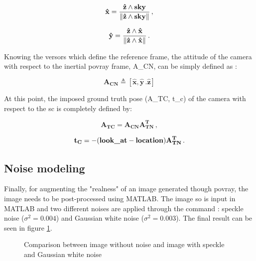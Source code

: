 \begin{equation}
  \mathbf{\hat{x}} = \frac{\mathbf{\hat{z}} \wedge \text{\inlinecode{POV}{sky}}}{\norm{\mathbf{\hat{z}} \wedge \text{\inlinecode{POV}{sky}}}} \,,
\end{equation}

\begin{equation}
  \mathbf{\hat{y}} = \frac{\mathbf{\hat{z}} \wedge \mathbf{\hat{x}}}{\left\lVert\mathbf{\hat{z}} \wedge \mathbf{\hat{x}}\right\rVert} \,.
\end{equation}

Knowing the versors which define the reference frame, the attitude of the camera with respect to the inertial \acrshort{povray} frame, \gls{A_CN}, can be simply defined as :

\begin{equation}
  \mathbf{{A_{CN}}} \triangleq [\mathbf{\hat{x}}, \mathbf{\hat{y}} \,. \mathbf{\hat{z}}]
\end{equation}

At this point, the imposed ground truth pose (\gls{A_TC}, \gls{t_c}) of the camera with respect to the \acrshort{sc} is completely defined by:

\begin{equation}
  \mathbf{{A_{TC}}} = \mathbf{{A_{CN}}} \mathbf{{A^T_{TN}}} \,,
\end{equation}

\begin{equation}
  \mathbf{t_C} = - (\text{\inlinecode{POV}{look_at}} - \text{\inlinecode{POV}{location}}) \mathbf{{A^T_{TN}}} \,.
\end{equation}

\subsection{Noise modeling}\label{subsection:addingthenoise}
Finally, for augmenting the "realness" of an image generated though \acrshort{povray}, the image needs to be post-processed using MATLAB.
The image so is input in MATLAB and two different noises are applied through the  command : speckle noise ($\sigma^2 = 0.004$) and Gaussian white noise ($\sigma^2 = 0.003$).
The final result can be seen in figure \ref{fig:comparisonNoise}.

\begin{figure}[htbp]
  \centering
  \qquad
  \caption{Comparison between image without noise and image with speckle and Gaussian white noise}
  \label{fig:comparisonNoise}
\end{figure}

